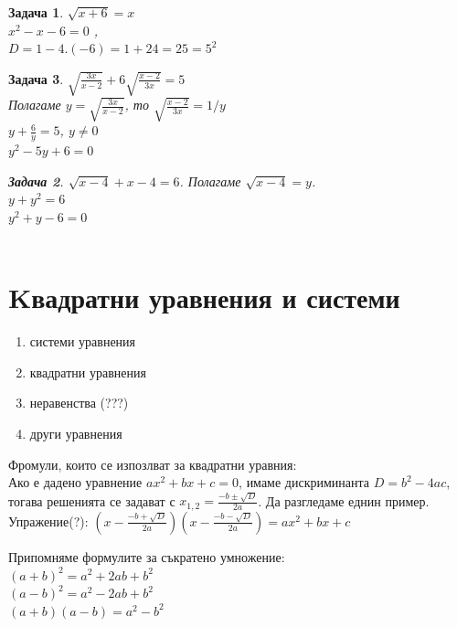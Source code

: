 \documentclass{article}
\newtheorem{problem}{Задача}
\begin{document}
\begin{problem}
	$\sqrt{x+6} = x$ \\
	$x^2 -x - 6 = 0 $  , \\
	$D = 1 - 4.(-6) = 1 +24 = 25 = 5^2   $
	
\end{problem}



\begin{problem}
	$\sqrt{\frac{3x}{x-2}} + 6 \sqrt{\frac{x-2}{3x}} = 5 $ \\
	Полагаме $y = \sqrt{\frac{3x}{x-2}}  $, то $\sqrt{\frac{x-2}{3x}} = 1/y $ \\
	$y + \frac{6}{y}= 5$, $y \neq 0 $ \\ 
	$y^2 - 5y + 6 = 0 $
	
	
	\begin{problem}
		$\sqrt{x - 4} + x - 4  = 6$. Полагаме $\sqrt{x - 4} = y$. \\
		$ y + y^2 = 6 $ \\
		$y^2  +y - 6 = 0$  \\
		$ $ 
	\end{problem}
	
	
\end{problem}
	
	
	\section{Kвадратни уравнения и системи}
	
		
	\begin{enumerate}
		\item системи уравнения
		\item квадратни уравнения
		\item неравенства (???)
		\item други уравнения
	\end{enumerate}
	
	
	
	Фромули, които се изпозлват за квадратни уравния: \\
	Ако е дадено уравнение $ax^2 + bx + c = 0  $, имаме дискриминанта  $ D= b^2 - 4ac $, тогава решенията се задават с $ x_{1,2} = \frac{-b \pm \sqrt{D}  }{2a}$. Да разгледаме еднин пример. 
	Упражение(?): $(x - \frac{-b + \sqrt{D}  }{2a}  )(x - \frac{-b - \sqrt{D}  }{2a}) = ax^2 + bx +c $

	
	Припомняме формулите за съкратено умножение:\\
	 $(a+b)^2 = a^2 + 2ab + b^2$ \\
	 $(a-b)^2 = a^2 - 2ab + b^2$ \\
	 $(a+b)(a-b) = a^2 - b^2 $
	 
\end{document}
